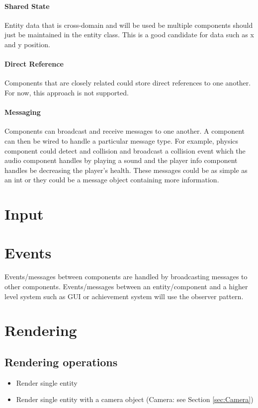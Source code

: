 \documentclass[12pt]{article}
\begin{document}
\paragraph{ Shared State}
Entity data that is cross-domain and will be used be multiple components should just be maintained in the entity class.  This is a good candidate for data such as x and y position.
\paragraph{ Direct Reference }
Components that are closely related could store direct references to one another.  For now, this approach is not supported.
\paragraph{ Messaging }
Components can broadcast and receive messages to one another.  A component can then be wired to handle a particular message type.  For example, physics component could detect and collision and broadcast a collision event which the audio component handles by playing a sound and the player info component handles be decreasing the player's health.  These messages could be as simple as an int or they could be a message object containing more information.

\section{	Input }

\section{	Events }
Events/messages between components are handled by broadcasting messages to other components.  Events/messages between an entity/component and a higher level system such as GUI or achievement system will use the observer pattern.  

\section{	Rendering }
\subsection{Rendering operations }
\begin{itemize}
	\item Render single entity
	\item Render single entity with a camera object (Camera: see Section \ref{sec:Camera})
\end{itemize}
\end{document}
